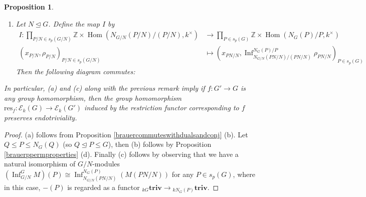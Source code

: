 \documentclass[10pt,letterpaper, boxed, cm]{amsart}
\newcommand{\Z}{\mathbb{Z}}
\newcommand{\Hom}{\operatorname{Hom}}
\newcommand{\Inf}{\operatorname{Inf}}
\newcommand{\calE}{\mathcal{E}}
\newtheorem{prop}[theorem]{Proposition}
\theoremstyle{remark}
\theoremstyle{definition}
\begin{document}
\begin{prop}
\begin{enumerate}
			\item Let $N \trianglelefteq G$. Define the map $I$ by
			\begin{align*}
			I: \prod_{P/N \in s_p(G/N)} \Z \times \Hom(N_{G/N}(P/N)/(P/N), k^\times) &\to  \prod_{P \in s_p(G)} \Z \times \Hom(N_G(P)/P,k^\times) \\
			(x_{P/N}, \rho_{P/N})_{P/N \in s_p(G/N)} &\mapsto \left(x_{PN/N},\Inf^{N_G(P)/P}_{N_{G/N}(PN/N)/(PN/N)}\rho_{PN/N}\right)_{P \in s_p(G)}
			\end{align*}
			Then the following diagram commutes:
			\begin{figure}[H]
				\centering
			\end{figure}
		\end{enumerate}
		In particular, (a) and (c) along with the previous remark imply if $f: G' \to G$ is any group homomorphism, then the group homomorphism $\text{res}_f: \calE_k(G) \to \calE_k(G')$ induced by the restriction functor corresponding to $f$ preserves endotriviality.
	\end{prop}
	\begin{proof}
		(a) follows from Proposition \ref{brauercommuteswithdualsandconj} (b). Let $Q \leq P \leq N_G(Q)$ (so $Q \trianglelefteq P \leq G$), then (b) follows by Proposition \ref{brauerppermproperties} (d). Finally (c) follows by observing that we have a natural isomorphism of $G/N$-modules $(\Inf^G_{G/N} M)(P) \cong \Inf^{N_G(P)}_{N_{G/N}(PN/N)} (M(PN/N))$ for any $P \in s_p(G)$, where in this case, $-(P)$ is regarded as a functor ${}_{kG}\textbf{triv} \to {}_{kN_G(P)}\textbf{triv}$.
	\end{proof}
\end{document}
